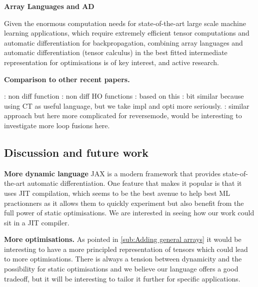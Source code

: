\noindent \textbf{Array Languages and AD}

Given the enormous computation needs for state-of-the-art large scale machine learning applications, 
which require extremely efficient tensor computations and automatic differentiation for backpropagation, 
combining array languages and automatic differentiation (tensor calculus) in the best 
fitted intermediate representation for optimisations is of key interest, and active research.
\cite{bernstein2020differentiating} 
\cite{laue2018computing,laue2020simple}

\noindent \textbf{Comparison to other recent papers.}

\cite{ee2020correctness}: non diff function
\cite{sherman2021}: non diff HO functions
\cite{pearlmutter2008reverse}: based on this
\cite{elliott2018simple}: bit similar because using CT as useful language, but we take impl and opti more seriously.
\cite{shaikhha2019efficient}: similar approach but here more complicated for reversemode, would be interesting to investigate more loop fusions here.

\subsection{Discussion and future work} %
\label{sub:discussion_and_future_work}

\noindent \textbf{More dynamic language}
JAX \cite{bradbury2020jax,frostig2018compiling} is a modern framework that provides state-of-the-art automatic differentiation. 
One feature that makes it popular is that it uses JIT compilation, 
which seems to be the best avenue to help best ML practionners as it allows them 
to quickly experiment but also benefit from the full power of static optimisations.
We are interested in seeing how our work could sit in a JIT compiler. 

\noindent \textbf{More optimisations.}
As pointed in \ref{sub:Adding general arrays} it would be interesting to have a more principled representation 
of tensors which could lead to more optimisations. 
There is always a tension between dynamicity and the possibility for static optimisations 
and we believe our language offers a good tradeoff, but it will be interesting to tailor it 
further for specific applications.

